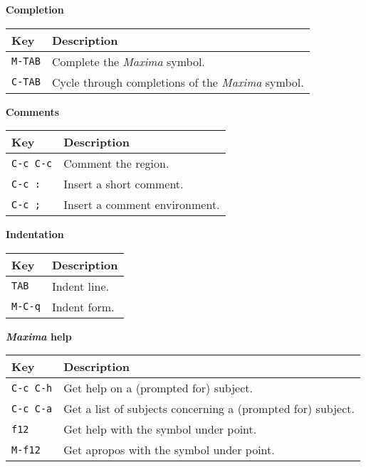 \documentclass{article}
\newcommand{\mx}{\textsl{\sffamily Maxima}}
\begin{document}
\smallskip

\noindent
\textbf{Completion}

\smallskip

\noindent
\begin{tabular}{p{\firstcol}p{\secondcol}}
\hline
\textbf{Key} & \textbf{Description}\\
\hline
\texttt{M-TAB} & Complete the \mx{} symbol.\\
\texttt{C-TAB} & Cycle through completions of the \mx{} symbol.\\
\end{tabular}

\smallskip

\noindent
\textbf{Comments}

\smallskip

\noindent
\begin{tabular}{p{\firstcol}p{\secondcol}}
\hline
\textbf{Key} & \textbf{Description}\\
\hline
\texttt{C-c C-c} & Comment the region.\\
\texttt{C-c :} & Insert a short comment.\\
\texttt{C-c ;} & Insert a comment environment.
\end{tabular}


\smallskip

\noindent
\textbf{Indentation}

\smallskip

\noindent
\begin{tabular}{p{\firstcol}p{\secondcol}}
\hline
\textbf{Key} & \textbf{Description}\\
\hline
\texttt{TAB} & Indent line.\\
\texttt{M-C-q} & Indent form.
\end{tabular}


\smallskip

\noindent
\textbf{\mx{} help}

\smallskip

\noindent
\begin{tabular}{p{\firstcol}p{\secondcol}}
\hline
\textbf{Key} & \textbf{Description}\\
\hline
\texttt{C-c C-h}
& Get help on a (prompted for) subject.\\
\texttt{C-c C-a}
& Get a list of subjects concerning a (prompted for) subject.\\
\texttt{f12} & Get help with the symbol under point.\\
\texttt{M-f12} & Get apropos with the symbol under point.
\end{tabular}
\end{document}
